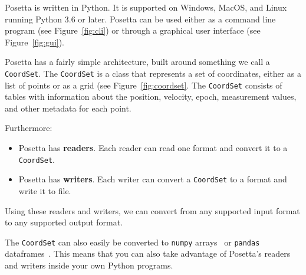 Posetta is written in Python. It is supported on Windows, MacOS, and Linux running Python 3.6 or later. Posetta can be used either as a command line program (see Figure~\ref{fig:cli}) or through a graphical user interface (see Figure~\ref{fig:gui}).

\columnbreak
Posetta has a fairly simple architecture, built around something we call a \texttt{CoordSet}. The \texttt{CoordSet} is a class that represents a set of coordinates, either as a list of points or as a grid (see Figure~\ref{fig:coordset}. The \texttt{CoordSet} consists of tables with information about the position, velocity, epoch, measurement values, and other metadata for each point.

Furthermore:

\begin{itemize}
\item Posetta has \textbf{readers}. Each reader can read one format and convert it to a \texttt{CoordSet}.
\item Posetta has \textbf{writers}. Each writer can convert a \texttt{CoordSet} to a format and write it to file.
\end{itemize}

Using these readers and writers, we can convert from any supported input format to any supported output format.

The \texttt{CoordSet} can also easily be converted to \texttt{numpy} arrays~\cite{oliphant2006} or \texttt{pandas} dataframes~\cite{mckinney2010}. This means that you can also take advantage of Posetta's readers and writers inside your own Python programs.

\endinput
